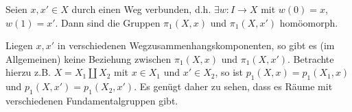 
\begin{theorem}\label{thm:pi-1-ist-gleich-auf-wegusammenhangskomponente}
    Seien $x,x' \in X$ durch einen Weg verbunden, d.h. $\exists w\colon  I \to X$ mit $w(0) = x$,  $w(1) = x'$. Dann sind die Gruppen  $\pi_1(X,x)$ und $\pi_1(X,x')$ homöomorph.
\end{theorem}

\begin{remark}
    Liegen $x,x'$ in verschiedenen Wegzusammenhangskomponenten, so gibt es (im Allgemeinen) keine Beziehung zwischen  $\pi_1(X,x)$ und $\pi_1(X,x')$. Betrachte hierzu z.B. $X = X_1 \coprod X_2$ mit $x\in X_1$ und $x' \in X_2$, so ist $p_1(X,x) = p_1(X_1,x)$ und $p_1(X,x') = p_1(X_2,x')$. Es genügt daher zu sehen, dass es Räume mit verschiedenen Fundamentalgruppen gibt.
\end{remark}

